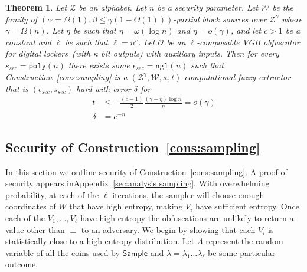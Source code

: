 \documentclass[11pt]{article}
\newcommand{\apref}[1]{\mbox{Appendix~\ref{#1}}}
\newcommand{\lemref}[1]{\mbox{Lemma~\ref{#1}}}
\newcommand{\consref}[1]{\mbox{Construction~\ref{#1}}}
\newcommand{\class}[1]{{\ensuremath{\mathsf{#1}}}}
\newcommand{\sample}{\ensuremath{\class{Sample}}\xspace}
\newcommand{\poly}{\ensuremath{\mathtt{poly}}\xspace}
\newcommand{\ngl}{\ensuremath{\mathtt{ngl}}\xspace}
\newtheorem{theorem}{Theorem}[section]
\begin{document}
\begin{theorem}
\label{thm:sampling}
Let $\mathcal{Z}$ be an alphabet.  Let $n$ be a security parameter.  Let $\mathcal{W}$ be the family of $(\alpha = \Omega(1), \beta\leq \gamma(1-\Theta(1)))$-partial block sources over $\mathcal{Z}^\gamma$ where $\gamma =\Omega(n)$.  Let $\eta$ be such that $\eta = \omega(\log n)$ and $\eta = o(\gamma)$, and let $c> 1$ be a constant and $\ell$ be such that $\ell = n^c$.  Let $\mathcal{O}$ be an $\ell$-composable VGB obfuscator for digital lockers~(with $\kappa$ bit outputs) with auxiliary inputs.  Then for every $s_{sec} = \poly(n)$ there exists some $\epsilon_{sec} = \ngl(n)$ such that \consref{cons:sampling} is a $(\mathcal{Z}^\gamma, \mathcal{W}, \kappa, t)$-computational fuzzy extractor that is $(\epsilon_{sec}, s_{sec})$-hard with error $\delta$ for 
\begin{align*}
t&\leq -\frac{(c-1)}{2} \frac{(\gamma-\eta)\log n}{\eta} = o(\gamma)\\
\delta &= e^{-n}
\end{align*}
\end{theorem}

\subsection{Security of \consref{cons:sampling}}
\label{ssec:sec cons sampling}
In this section we outline security of \consref{cons:sampling}.  A proof of security appears in\apref{sec:analysis sampling}.  
With overwhelming probability, at each of the $\ell$ iterations, the sampler will choose enough coordinates of $W$ that have high entropy, making $V_i$ have sufficient entropy.   Once each of the $V_1,..., V_\ell$ have high entropy the obfuscations are unlikely to return a value other than $\perp$ to an adversary.
We begin by showing that each $V_i$ is statistically close to a high entropy distribution.   Let $\Lambda$ represent the random variable of all the coins used by $\sample$ and $\lambda=\lambda_1 \dots \lambda_\ell$
be some particular outcome.
\end{document}
